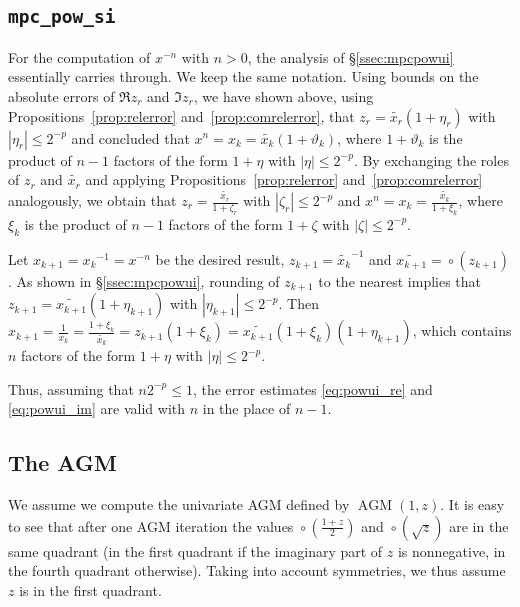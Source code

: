 \documentclass [12pt]{article}
\newcommand {\corr}[1]{{#1}}
\newcommand {\appro}[1]{\widetilde {#1}}
\newcommand {\round}{\operatorname {\circ}}
\renewcommand {\theta}{\vartheta}
\renewcommand {\leq}{\leqslant}
\newcommand {\AGM}{\operatorname{AGM}}
\begin{document}
\subsection {\texttt {mpc\_pow\_si}}

For the computation of $x^{-n}$ with $n > 0$, the analysis of
\S\ref {ssec:mpcpowui} essentially carries through. We keep the same
notation. Using bounds on the absolute errors of $\Re z_r$ and $\Im z_r$,
we have shown above, using Propositions~\ref {prop:relerror}
and~\ref {prop:comrelerror}, that $z_r = \appro {x_r} (1 + \eta_r)$ with
$|\eta_r| \leq 2^{-p}$ and concluded that
$x^n = \corr {x_k} = \appro {x_k} (1 + \theta_k)$, where
$1 + \theta_k$ is the product of $n-1$ factors of the form
$1 + \eta$  with $|\eta| \leq 2^{-p}$.
By exchanging the roles of $z_r$ and $\appro {x_r}$ and applying
Propositions~\ref {prop:relerror} and~\ref {prop:comrelerror}
analogously, we obtain that $z_r = \frac {\appro {x_r}}{1 + \zeta_r}$ with
$|\zeta_r| \leq 2^{-p}$ and
$x^n = \corr {x_k} = \frac {\appro {x_k}}{1 + \xi_k}$, where
$\xi_k$ is the product of $n-1$ factors of the form
$1 + \zeta$  with $|\zeta| \leq 2^{-p}$.

Let $\corr {x_{k+1}} = \corr {x_k}^{-1} = x^{-n}$ be the desired
result, $z_{k+1} = \appro {x_k}^{-1}$
and $\appro {x_{k+1}} = \round (z_{k+1})$. As shown in \S\ref {ssec:mpcpowui},
rounding of $z_{k+1}$ to the nearest implies that
$z_{k+1} = \appro {x_{k+1}} (1 + \eta_{k+1})$ with
$|\eta_{k+1}| \leq 2^{-p}$.
Then $\corr {x_{k+1}} = \frac {1}{x_k}
= \frac {1 + \xi_k}{\appro {x_k}}
= z_{k+1} (1 + \xi_k)
= \appro {x_{k+1}} (1 + \xi_k)(1 + \eta_{k+1})$,
which contains $n$ factors of the form $1 + \eta$ with
$|\eta| \leq 2^{-p}$.

Thus, assuming that $n 2^{-p} \leq 1$, the error estimates
\eqref {eq:powui_re} and \eqref {eq:powui_im} are valid with $n$
in the place of $n - 1$.

\subsection{The AGM}

We assume we compute the univariate AGM defined by $\AGM(1,z)$.
It is easy to see
that after one AGM iteration the values
$\round \left( \frac {1+z}{2} \right)$ and
$\round (\sqrt{z})$ are in the same quadrant (in the first quadrant if the
imaginary part of $z$ is nonnegative, in the fourth quadrant otherwise).
Taking into account symmetries, we thus assume $z$ is in the first quadrant.
\end{document}
